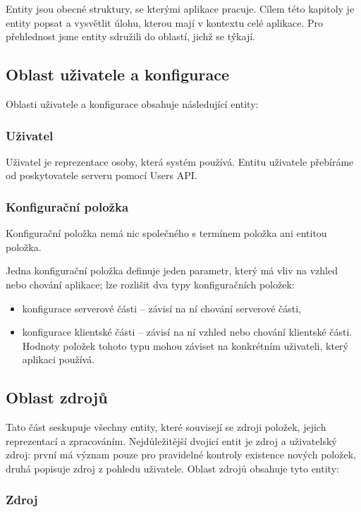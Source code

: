 Entity jsou obecné struktury, se kterými aplikace pracuje.
Cílem této kapitoly je entity popsat a vysvětlit úlohu, kterou mají v kontextu celé aplikace.
Pro přehlednost jsme entity sdružili do oblastí, jichž se týkají.

\subsection{Oblast uživatele a konfigurace}

Oblasti uživatele a konfigurace obsahuje následující entity:

\subsubsection{Uživatel}

Uživatel je reprezentace osoby, která systém používá.
Entitu uživatele přebíráme od poskytovatele serveru pomocí Users API.

\subsubsection{Konfigurační položka}

Konfigurační položka nemá nic společného s termínem položka ani entitou položka.

Jedna konfigurační položka definuje jeden parametr, který má vliv na vzhled nebo chování aplikace; lze rozlišit dva typy konfiguračních položek:
\begin{itemize}
	\item konfigurace serverové části -- závisí na ní chování serverové části,
	\item konfigurace klientské části -- závisí na ní vzhled nebo chování klientské části.
		Hodnoty položek tohoto typu mohou záviset na konkrétním uživateli, který aplikaci používá.
\end{itemize}

\subsection{Oblast zdrojů}

Tato část seskupuje všechny entity, které souvisejí se zdroji položek, jejich reprezentací a zpracováním.
Nejdůležitější dvojicí entit je zdroj a uživatelský zdroj: první má význam pouze pro pravidelné kontroly existence nových položek, druhá popisuje zdroj z pohledu uživatele.
Oblast zdrojů obsahuje tyto entity:

\subsubsection{Zdroj}
\label{sss:zdroj}


